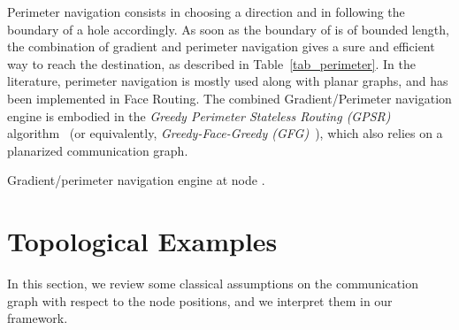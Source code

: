 \documentclass{article}
\begin{document}
Perimeter navigation consists in choosing a direction and in following the boundary of a hole accordingly. As soon as the boundary of  is of bounded length, the combination of gradient and perimeter navigation gives a sure and efficient way to reach the destination, as described in Table~\ref{tab_perimeter}.
In the literature, perimeter navigation is mostly used along with planar graphs, and has been implemented in Face Routing. The combined Gradient/Perimeter navigation engine is embodied in the {\em Greedy Perimeter Stateless Routing (GPSR)} algorithm~\cite{bib_gpsr} (or equivalently, {\em Greedy-Face-Greedy (GFG)}~\cite{bib_gfg}), which also relies on a planarized communication graph.

\begin{table}[h]
\begin{center}
\end{center}
\caption{Gradient/perimeter navigation engine at node .}
\label{tab_perimeter}
\end{table}


\section{Topological Examples}
\label{sec_examples}
In this section, we review some classical assumptions on the communication graph with respect to the node positions, and we interpret them in our framework.
\end{document}
